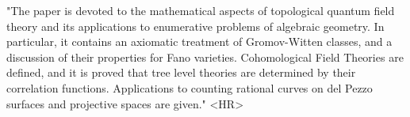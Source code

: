 "The paper is devoted to the mathematical aspects of topological
quantum field theory and its applications to enumerative problems
of algebraic geometry. In particular, it contains an axiomatic
treatment of Gromov-Witten classes, and a discussion of their
properties for Fano varieties. Cohomological Field Theories
are defined, and it is proved that tree level theories
are determined by their correlation functions. Applications
to counting rational curves on del Pezzo surfaces and projective
spaces are given."
<HR>



